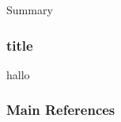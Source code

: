 \documentclass[10pt]{beamer}
\begin{document}
  \begin{frame}{Summary}
    \begin{center}\ccbysa\end{center}
  \end{frame}

  \begin{frame}
    \frametitle{title}
    \begin{figure}
      \newlength\figureheight
      \newlength\figurewidth
      \setlength\figureheight{4cm}
      \setlength\figurewidth{6cm}
          
    \end{figure}


      hallo
  \end{frame}


  \begin{frame}[allowframebreaks]\frametitle{Main References}

    
    

  \end{frame}
\end{document}
